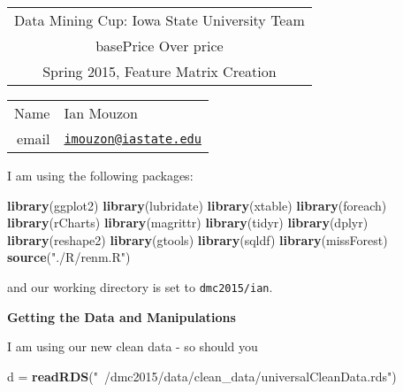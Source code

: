 \documentclass[10pt]{report}
\newenvironment{Shaded}{}{}
\newcommand{\KeywordTok}[1]{\textcolor[rgb]{0.00,0.44,0.13}{\textbf{{#1}}}}
\newcommand{\StringTok}[1]{\textcolor[rgb]{0.25,0.44,0.63}{{#1}}}
\newcommand{\NormalTok}[1]{{#1}}
\begin{document}
\thispagestyle{empty}%
\begin{center}%
    \renewcommand{\arraystretch}{1.5}%
    \begin{tabular}{c}%
       \Large{Data Mining Cup: Iowa State University Team}\\
       basePrice Over price\\
       Spring 2015, Feature Matrix Creation \\
    \end{tabular}
\end{center}

\begin{center}
 \renewcommand{\arraystretch}{1.5}
 \begin{tabular*}{0.65\textwidth}{r@{:\hspace{.3cm}}l}
    \hline
     Name& Ian Mouzon\\
     email& \href{mailto:imouzon@iastate.edu}{\nolinkurl{imouzon@iastate.edu}}\\
    
    
    
    \hline
 \end{tabular*}
\end{center}

I am using the following packages:

\begin{Shaded}
\begin{Highlighting}[]
   \KeywordTok{library}\NormalTok{(ggplot2)}
   \KeywordTok{library}\NormalTok{(lubridate)}
   \KeywordTok{library}\NormalTok{(xtable)}
   \KeywordTok{library}\NormalTok{(foreach)}
   \KeywordTok{library}\NormalTok{(rCharts)}
   \KeywordTok{library}\NormalTok{(magrittr)}
   \KeywordTok{library}\NormalTok{(tidyr)}
   \KeywordTok{library}\NormalTok{(dplyr)}
   \KeywordTok{library}\NormalTok{(reshape2)}
   \KeywordTok{library}\NormalTok{(gtools)}
   \KeywordTok{library}\NormalTok{(sqldf)}
   \KeywordTok{library}\NormalTok{(missForest)}
   \KeywordTok{source}\NormalTok{(}\StringTok{"./R/renm.R"}\NormalTok{)}
\end{Highlighting}
\end{Shaded}

and our working directory is set to \verb!dmc2015/ian!.

\textbf{Getting the Data and Manipulations}

I am using our new clean data - so should you

\begin{Shaded}
\begin{Highlighting}[]
   \NormalTok{d =}\StringTok{ }\KeywordTok{readRDS}\NormalTok{(}\StringTok{"~/dmc2015/data/clean_data/universalCleanData.rds"}\NormalTok{)}
\end{Highlighting}
\end{Shaded}
\end{document}
